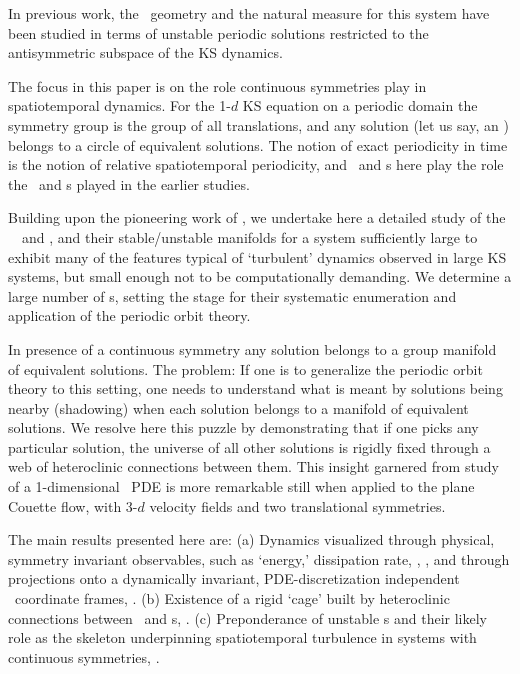 In previous work, the \statesp\ geometry and the natural measure for
this system have been
studied in terms of unstable
periodic solutions restricted to the antisymmetric subspace of the
KS dynamics.

The focus in this paper is on the role continuous symmetries play in
spatiotemporal dynamics.  For the 1-$d$ KS equation on a periodic
domain the symmetry group is the group of all translations, and any
solution (let us say, an \eqv ) belongs to a circle of equivalent
solutions. The notion of exact periodicity in time is
 the notion of relative spatiotemporal
periodicity, and \reqva\ and \rpo s here play the role the \eqva\
and \po s played in the earlier studies.

Building upon the pioneering work of ,
we undertake here a detailed study of the \KS\ \eqva\ and \reqva,
and their stable/unstable manifolds for a system sufficiently large
to exhibit many of the features typical of `turbulent' dynamics
observed in large KS systems, but small enough not to be
computationally demanding.  We determine a large number of \rpo s,
setting the stage for their systematic enumeration and application
of the periodic orbit theory.

In presence of a continuous symmetry any solution belongs to a group
manifold of equivalent solutions. The problem: If one is to
generalize the periodic orbit theory to this setting, one needs to
understand what is meant by solutions being nearby (shadowing) when
each solution belongs to a manifold of equivalent solutions. We
resolve here this puzzle by demonstrating that if one picks any
particular solution, the universe of all other solutions is rigidly
fixed through a web of heteroclinic connections between them. This
insight garnered from study of a 1-dimensional \KS\ PDE is more
remarkable still when applied to the plane Couette flow,
with 3-$d$ velocity fields and two translational symmetries.


The main results presented here are: (a) Dynamics visualized through
physical, symmetry invariant observables, such as `energy,'
dissipation rate, \etc, , and through
projections onto a dynamically invariant, PDE-discretization
independent \statesp\ coordinate frames, . (b)
Existence of a rigid `cage' built by heteroclinic connections
between \eqva\ and \po s, . (c) Preponderance of
unstable \rpo s and their likely role as the skeleton underpinning
spatiotemporal turbulence in systems with continuous symmetries,
\refsect{sec:rpos}.

